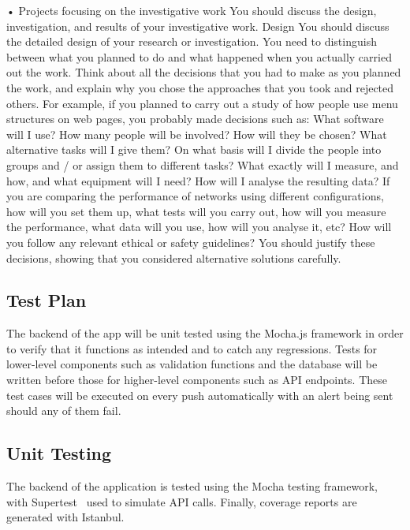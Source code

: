{    •	Projects focusing on the investigative work
    You should discuss the design, investigation, and results of your investigative work.
    Design
    You should discuss the detailed design of your research or investigation. You need to distinguish between what you planned to do and what happened when you actually
    carried out the work. Think about all the decisions that you had to make as you planned the work, and explain why you chose the approaches that you took and rejected others.
    For example, if you planned to carry out a study of how people use menu structures on web pages, you probably made decisions such as: What software will I use? How many
    people will be involved? How will they be chosen? What alternative tasks will I give them? On what basis will I divide the people into groups and / or assign them
    to different tasks? What exactly will I measure, and how, and what equipment will I need? How will I analyse the resulting data? If you are comparing the performance
    of networks using different configurations, how will you set them up, what tests will you carry out, how will you measure the performance, what data will you use, how
    will you analyse it, etc? How will you follow any relevant ethical or safety guidelines? You should justify these decisions, showing that you considered alternative
    solutions carefully.
}


\subsection{Test Plan}
The backend of the app will be unit tested using the Mocha.js framework in order
to verify that it functions as intended and to catch any regressions. Tests for lower-level components
such as validation functions and the database will be written before those for higher-level
components such as API endpoints. These test cases will be executed on every push automatically
with an alert being sent should any of them fail.

\subsection{Unit Testing}
The backend of the application is tested using the Mocha testing framework,~\cite{noauthor_mocha_nodate} with Supertest~\cite{noauthor_ladjssupertest_2024}
used to simulate API calls. Finally, coverage reports are generated with Istanbul.~\cite{noauthor_istanbul_nodate}

